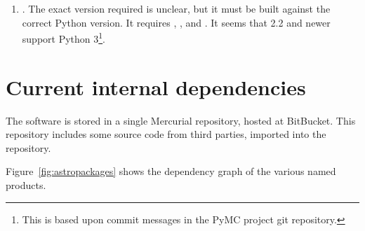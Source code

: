 \documentclass[draftmode,draftwater]{memarticle}
\newcommand{\despipe}{\name{des-pipe}\xspace}
\begin{document}
\begin{enumerate}
  be built against the correct Python version.  requires
   for full utility, but can work without it; it also
  requires . As of version 1.1,  is compatible
  with Python 3. The version current as May~7, 2013 is 1.2.
\item {}. The exact version required is unclear, but it must be
  built against the correct Python version. It requires ,
  , and . It seems that  2.2 and
  newer support Python 3\footnote{This is based upon commit messages in
    the PyMC project git repository.}.
\end{enumerate}

\section{Current internal dependencies}

The \despipe software is stored in a single
Mercurial\cite{mercurial} repository, hosted at
BitBucket\cite{bitbucket}. This repository includes some source code
from third parties, imported into the repository.

Figure~\ref{fig:astropackages} shows the dependency graph of the various
named products.
\end{document}
